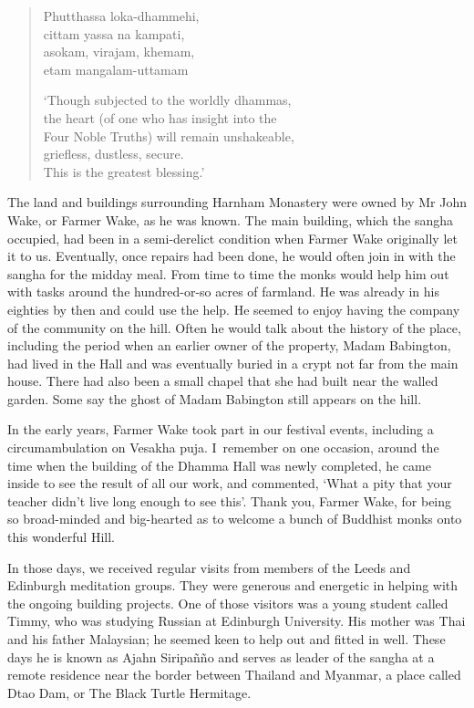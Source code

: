 \clearpage

\begin{quote}
  Phutthassa loka-dhammehi,\\
  cittam yassa na kampati,\\
  asokam, virajam, khemam,\\
  etam mangalam-uttamam

  `Though subjected to the worldly dhammas,\\
  the heart (of one who has insight into the\\
  Four Noble Truths) will remain unshakeable,\\
  griefless, dustless, secure.\\
  This is the greatest blessing.'
\end{quote}

The land and buildings surrounding Harnham Monastery were owned by Mr
John Wake, or Farmer Wake, as he was known. The main building, which the
sangha occupied, had been in a semi-derelict condition when Farmer Wake
originally let it to us. Eventually, once repairs had been done, he
would often join in with the sangha for the midday meal. From time to
time the monks would help him out with tasks around the hundred-or-so
acres of farmland. He was already in his eighties by then and could use
the help. He seemed to enjoy having the company of the community on the
hill. Often he would talk about the history of the place, including the
period when an earlier owner of the property,
Madam Babington\cite{babington}, had lived in the Hall and was eventually buried in
a crypt not far from the main house. There had also been a small chapel
that she had built near the walled garden. Some say the ghost of Madam
Babington still appears on the hill.

In the early years, Farmer Wake took part in our festival events,
including a circumambulation on Vesakha puja. I~remember on one
occasion, around the time when the building of the Dhamma Hall was newly
completed, he came inside to see the result of all our work, and
commented, `What a pity that your teacher didn't live long enough to see
this'. Thank you, Farmer Wake, for being so broad-minded and big-hearted
as to welcome a bunch of Buddhist monks onto this wonderful Hill.

In those days, we received regular visits from members of the Leeds and
Edinburgh meditation groups. They were generous and energetic in helping
with the ongoing building projects. One of those visitors was a young
student called Timmy, who was studying Russian at Edinburgh University.
His mother was Thai and his father Malaysian; he seemed keen to help out
and fitted in well. These days he is known as Ajahn Siripañño and serves
as leader of the sangha at a remote residence near the border between
Thailand and Myanmar, a place called Dtao Dam, or The Black Turtle
Hermitage.

